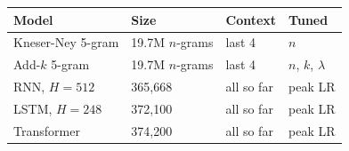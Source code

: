 \begin{tabular}{@{}llll@{}}
\toprule
Model & Size & Context & Tuned \\
\midrule
Kneser-Ney 5-gram & 19.7M $n$-grams & last 4 & $n$ \\
Add-$k$ 5-gram & 19.7M $n$-grams & last 4 & $n$, $k$, $\lambda$ \\
RNN, $H{=}512$ & 365,668 & all so far & peak LR \\
LSTM, $H{=}248$ & 372,100 & all so far & peak LR \\
Transformer & 374,200 & all so far & peak LR \\
\bottomrule
\end{tabular}
